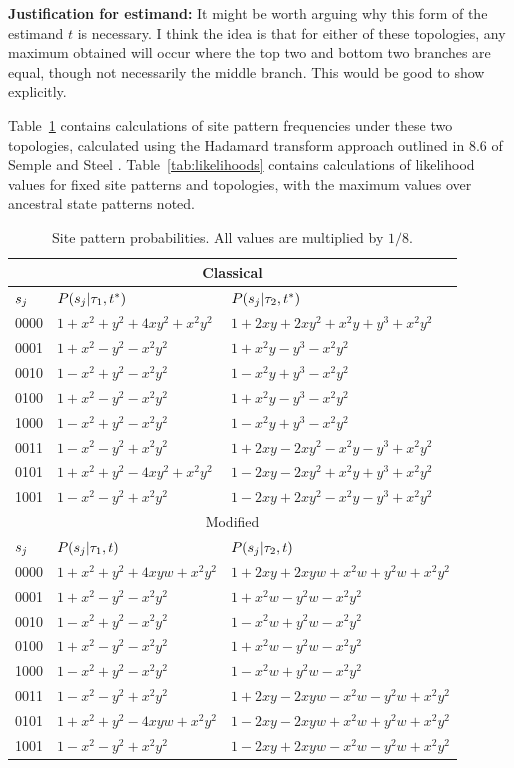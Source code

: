 \documentclass[a4paper]{article}
\begin{document}
\textbf{Justification for estimand:} It might be worth arguing why this form of the estimand $t$ is necessary.
I think the idea is that for either of these topologies, any maximum obtained will occur where the top two and bottom two branches are equal, though not necessarily the middle branch.
This would be good to show explicitly.

Table~\ref{tab:sitepatprob} contains calculations of site pattern frequencies under these two topologies, calculated using the Hadamard transform approach outlined in 8.6 of Semple and Steel \cite{Semple2003-em}.
Table~\ref{tab:likelihoods} contains calculations of likelihood values for fixed site patterns and topologies, with the maximum values over ancestral state patterns noted.

\begin{table}
\centering
\begin{tabular}{|l|l|l|}
\multicolumn{3}{c}{Classical}\\
    \hline
$s_j$   &$P(s_j|\tau_1,t^*)$&$P(s_j|\tau_2,t^*)$\\
    \hline
0000&$1+x^2+y^2+4xy^2+x^2y^2$&$1+2xy+2xy^2+x^2y+y^3+x^2y^2$\\
0001&$1+x^2-y^2-x^2y^2$&$1+x^2y-y^3-x^2y^2$\\
0010&$1-x^2+y^2-x^2y^2$&$1-x^2y+y^3-x^2y^2$\\
0100&$1+x^2-y^2-x^2y^2$&$1+x^2y-y^3-x^2y^2$\\
1000&$1-x^2+y^2-x^2y^2$&$1-x^2y+y^3-x^2y^2$\\
0011&$1-x^2-y^2+x^2y^2$&$1+2xy-2xy^2-x^2y-y^3+x^2y^2$\\
0101&$1+x^2+y^2-4xy^2+x^2y^2$&$1-2xy-2xy^2+x^2y+y^3+x^2y^2$\\
1001&$1-x^2-y^2+x^2y^2$&$1-2xy+2xy^2-x^2y-y^3+x^2y^2$\\
    \hline
\multicolumn{3}{c}{Modified}\\
    \hline
$s_j$   &$P(s_j|\tau_1,t)$&$P(s_j|\tau_2,t)$\\
    \hline
0000&$1+x^2+y^2+4xyw+x^2y^2$&$1+2xy+2xyw+x^2w+y^2w+x^2y^2$\\
0001&$1+x^2-y^2-x^2y^2$&$1+x^2w-y^2w-x^2y^2$\\
0010&$1-x^2+y^2-x^2y^2$&$1-x^2w+y^2w-x^2y^2$\\
0100&$1+x^2-y^2-x^2y^2$&$1+x^2w-y^2w-x^2y^2$\\
1000&$1-x^2+y^2-x^2y^2$&$1-x^2w+y^2w-x^2y^2$\\
0011&$1-x^2-y^2+x^2y^2$&$1+2xy-2xyw-x^2w-y^2w+x^2y^2$\\
0101&$1+x^2+y^2-4xyw+x^2y^2$&$1-2xy-2xyw+x^2w+y^2w+x^2y^2$\\
1001&$1-x^2-y^2+x^2y^2$&$1-2xy+2xyw-x^2w-y^2w+x^2y^2$\\
    \hline
\end{tabular}
\caption{Site pattern probabilities.
All values are multiplied by $1/8$.}
\label{tab:sitepatprob}
\end{table}
\end{document}
